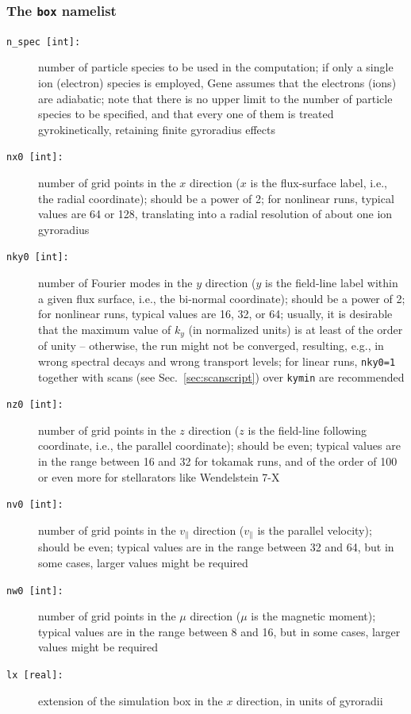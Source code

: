 \documentclass[12pt]{article}
\begin{document}
\subsubsection{The \texttt{box} namelist}
\begin{description}
\item[\texttt{n\_spec [int]:}] number of particle species to be used in the computation; if only a single
ion (electron) species is employed, {\sc Gene} assumes that the electrons (ions) are adiabatic; note
that there is no upper limit to the number of particle species to be specified, and that every one
of them is treated gyrokinetically, retaining finite gyroradius effects
\item[\texttt{nx0 [int]:}] number of grid points in the $x$ direction ($x$ is the flux-surface label,
i.e., the radial coordinate); should be a power of 2; for nonlinear runs, typical values are 64 or 128,
translating into a radial resolution of about one ion gyroradius
\item[\texttt{nky0 [int]:}] number of Fourier modes in the $y$ direction ($y$ is the field-line label within
a given flux surface, i.e., the bi-normal coordinate); should be a power of 2; for nonlinear runs, typical
values are 16, 32, or 64; usually, it is desirable that the maximum value of $k_y$ (in normalized units)
is at least of the order of unity -- otherwise, the run might not be converged, resulting, e.g., in wrong
spectral decays and wrong transport levels; for linear runs, \texttt{nky0=1} together with scans 
(see Sec.~\ref{sec:scanscript}) over \texttt{kymin} are recommended 
\item[\texttt{nz0 [int]:}] number of grid points in the $z$ direction ($z$ is the field-line following
coordinate, i.e., the parallel coordinate); should be even; typical values are in the range between 16
and 32 for tokamak runs, and of the order of 100 or even more for stellarators like Wendelstein 7-X
\item[\texttt{nv0 [int]:}] number of grid points in the $v_\|$ direction ($v_\|$ is the parallel velocity);
should be even; typical values are in the range between 32 and 64, but in some cases, larger values
might be required
\item[\texttt{nw0 [int]:}] number of grid points in the $\mu$ direction ($\mu$ is the magnetic moment);
typical values are in the range between 8 and 16, but in some cases, larger values might be required
\item[\texttt{lx [real]:}] extension of the simulation box in the $x$ direction, in units of gyroradii

\end{description}
\end{document}
